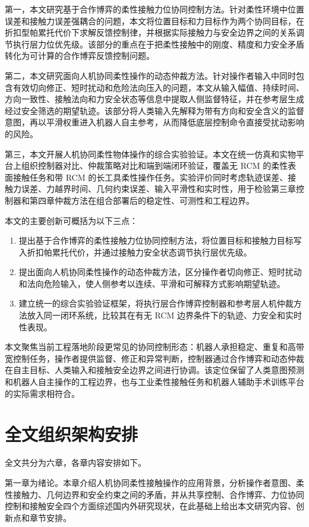 第一，本文研究基于合作博弈的柔性接触力位协同控制方法。针对柔性环境中位置误差和接触力误差强耦合的问题，本文将位置目标和力目标作为两个协同目标，在折扣型帕累托代价下求解反馈控制律，并根据实际接触力与安全边界之间的关系调节执行层力位优先级。该部分的重点在于把柔性接触中的刚度、精度和力安全矛盾转化为可计算的合作博弈反馈控制问题。

第二，本文研究面向人机协同柔性操作的动态仲裁方法。针对操作者输入中同时包含有效切向修正、短时扰动和危险法向压入的问题，本文从输入幅值、持续时间、方向一致性、接触法向和力安全状态等信息中提取人侧监督特征，并在参考层生成经过安全筛选的期望轨迹。该部分将人类输入先解释为带有方向和安全含义的监督意图，再以平滑权重进入机器人自主参考，从而降低底层控制命令直接受扰动影响的风险。

第三，本文开展人机协同柔性物体操作的综合实验验证。本文在统一仿真和实物平台上组织控制器对比、仲裁策略对比和端到端闭环验证，覆盖无 RCM 的柔性表面接触任务和带 RCM 的长工具柔性操作任务。实验评价同时考虑轨迹误差、接触力误差、力越界时间、几何约束误差、输入平滑性和实时性，用于检验第三章控制器和第四章仲裁方法在组合部署后的稳定性、可测性和工程边界。

本文的主要创新可概括为以下三点：
\begin{enumerate}[label=(\arabic*)]
  \item 提出基于合作博弈的柔性接触力位协同控制方法，将位置目标和接触力目标写入折扣帕累托代价，并通过接触力安全状态调节执行层优先级。
  \item 提出面向人机协同柔性操作的动态仲裁方法，区分操作者切向修正、短时扰动和法向危险输入，使人侧参考以连续、平滑和可解释方式影响期望轨迹。
  \item 建立统一的综合实验验证框架，将执行层合作博弈控制器和参考层人机仲裁方法放入同一闭环系统，比较其在有无 RCM 边界条件下的轨迹、力安全和实时性表现。
\end{enumerate}

本文聚焦当前工程落地阶段更常见的协同控制形态：机器人承担稳定、重复和高带宽控制任务，操作者提供监督、修正和异常判断，控制器通过合作博弈和动态仲裁在自主目标、人类输入和接触安全边界之间进行协调。该定位保留了人类意图预测和机器人自主操作的工程边界，也与工业柔性接触任务和机器人辅助手术训练平台的实际需求相符合。

\section{全文组织架构安排}
\label{sec:ch1_organization}

全文共分为六章，各章内容安排如下。

第一章为绪论。本章介绍人机协同柔性接触操作的应用背景，分析操作者意图、柔性接触力、几何边界和安全约束之间的矛盾，并从共享控制、合作博弈、力位协同控制和接触安全四个方面综述国内外研究现状，在此基础上给出本文研究内容、创新点和章节安排。

